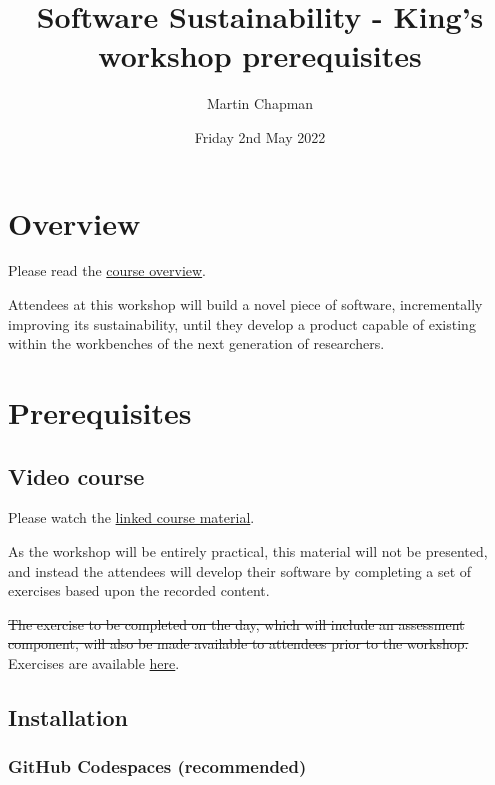 \documentclass{article}
\title{Software Sustainability - King's workshop prerequisites}
\author{Martin Chapman}
\date{Friday 2nd May 2022}
\begin{document}

\maketitle

\section{Overview}

Please read the \href{https://github.com/martinteaching/sustainability#overview}{course overview}.

Attendees at this workshop will build a novel piece of software, incrementally improving its sustainability, until they develop a product capable of existing within the workbenches of the next generation of researchers.

\section{Prerequisites}

\subsection{Video course}

Please watch the \href{https://github.com/martinteaching/sustainability#material}{linked course material}.

As the workshop will be entirely practical, this material will not be presented, and instead the attendees will develop their software by completing a set of exercises based upon the recorded content. 

\sout{The exercise to be completed on the day, which will include an assessment component, will also be made available to attendees prior to the workshop.} Exercises are available \href{https://github.com/martinteaching/sustainability/blob/master/workshops/kcl/2025/workshop-exercises.md}{here}.

\subsection{Installation}

\subsubsection{GitHub Codespaces (recommended)}
\end{document}
